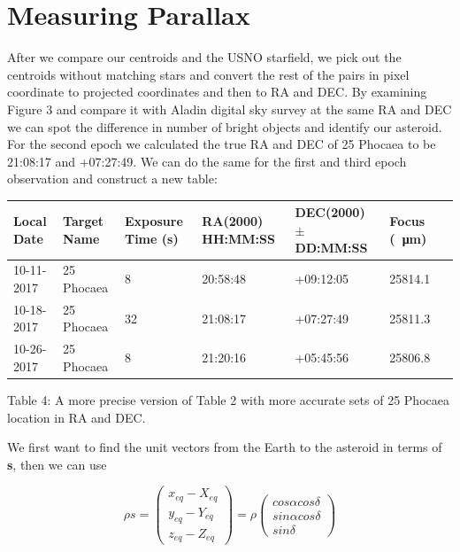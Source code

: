 \documentclass[onecolumn, 12pt, a4paper]{article}
\begin{document}
\section{Measuring Parallax}
After we compare our centroids and the USNO starfield, we pick out the centroids without matching stars and convert the rest of the pairs in pixel coordinate to projected coordinates and then to RA and DEC. By examining Figure 3 and compare it with Aladin digital sky survey at the same RA and DEC we can spot the difference in number of bright objects and identify our asteroid. For the second epoch we calculated the true RA and DEC of 25 Phocaea to be 21:08:17 and +07:27:49. We can do the same for the first and third epoch observation and construct a new table: \newline

\hspace*{-.5cm}\begin{tabular}{ |p{2cm}|p{2.5cm}|p{2cm}|p{2.3cm}|p{2.3cm}|p{2.5cm}|p{1.3cm}| }

 \hline
 Local Date & Target Name & Exposure Time (s)& RA(2000) HH:MM:SS & DEC(2000) $\pm$DD:MM:SS & Focus (\SI{}{\micro\metre})\\
 \hline
 10-11-2017 & 25 Phocaea & 8 & 20:58:48 & +09:12:05 & 25814.1\\
 \hline
 10-18-2017 & 25 Phocaea & 32 & 21:08:17 & +07:27:49 & 25811.3\\
 \hline
 10-26-2017 & 25 Phocaea & 8 & 21:20:16 & +05:45:56 & 25806.8\\
 \hline
\end{tabular}
\leavevmode
\newline

Table 4: A more precise version of Table 2 with more accurate sets of 25 Phocaea location in RA and DEC.

\leavevmode
\newline
We first want to find the unit vectors from the Earth to the asteroid in terms of \textbf{s}, then we can use 

\begin{equation}\label{}
\rho s =
\left(\begin{array}{ccc} x_{eq} - X_{eq} \\ y_{eq} - Y_{eq} \\ z_{eq} - Z_{eq} \end{array}\right)
= \rho
\left(\begin{array}{ccc} cos\alpha cos\delta \\ sin\alpha cos\delta \\ sin\delta \end{array}\right)
\end{equation}
\newline
\end{document}
